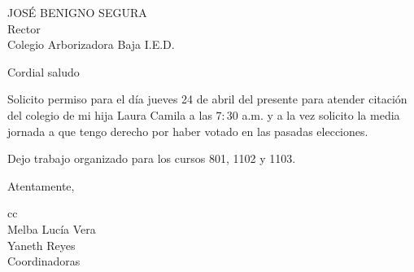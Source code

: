 \documentclass[letterpaper,spanish,11pt]{letter}
\begin{document}
\begin{letter}{JOSÉ BENIGNO SEGURA\\Rector\\Colegio Arborizadora Baja I.E.D.}
	
\opening{Cordial saludo}
Solicito permiso para el día jueves 24 de abril del presente para atender citación del colegio de mi hija Laura Camila a las $7:30$ a.m. y a la vez solicito la media jornada a que tengo derecho por haber votado en las pasadas elecciones.

Dejo trabajo organizado para los cursos 801, 1102 y 1103.
\closing{Atentamente,}

cc{\\Melba Lucía Vera\\Yaneth Reyes\\Coordinadoras}

\end{letter}
\end{document}
